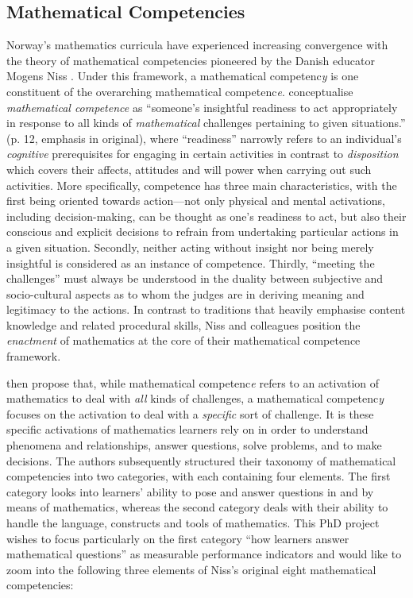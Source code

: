 \documentclass[
    a4paper,                %
    11pt,                   %
    stu,                    %
    donotrepeattitle,       %
    floatsintext,           %
    biblatex,               %
    colorlinks=true,        %
    linkcolor=red,          %
    anchorcolor=black,      %
    citecolor=blue,         %
    urlcolor=blue,          %
    bookmarks=true,         %
    bookmarksopen=false,    %
    bookmarksnumbered=true, %
    dvipsnames              %
]{apa7}
\begin{document}
\subsection{Mathematical Competencies}

Norway's mathematics curricula have experienced increasing convergence with the theory of mathematical competencies pioneered by the Danish educator Mogens Niss \parencite{niss:2003,niss:2011,niss:2019}. Under this framework, a mathematical competenc\emph{y} is one constituent of the overarching mathematical competenc\emph{e}. \textcite{niss:2019} conceptualise \emph{mathematical competence} as ``someone's insightful readiness to act appropriately in response to all kinds of \emph{mathematical} challenges pertaining to given situations.'' (p. 12, emphasis in original), where ``readiness'' narrowly refers to an individual's \emph{cognitive} prerequisites for engaging in certain activities in contrast to \emph{disposition} which covers their affects, attitudes and will power when carrying out such activities. More specifically, competence has three main characteristics, with the first being oriented towards action---not only physical and mental activations, including decision-making, can be thought as one's readiness to act, but also their conscious and explicit decisions to refrain from undertaking particular actions in a given situation. Secondly, neither acting without insight nor being merely insightful is considered as an instance of competence. Thirdly, ``meeting the challenges'' must always be understood in the duality between subjective and socio-cultural aspects as to whom the judges are in deriving meaning and legitimacy to the actions. In contrast to traditions that heavily emphasise content knowledge and related procedural skills, Niss and colleagues position the \emph{enactment} of mathematics at the core of their mathematical competence framework.

\textcite{niss:2019} then propose that, while mathematical competenc\emph{e} refers to an activation of mathematics to deal with \emph{all} kinds of challenges, a mathematical competenc\emph{y} focuses on the activation to deal with a \emph{specific} sort of challenge. It is these specific activations of mathematics learners rely on in order to understand phenomena and relationships, answer questions, solve problems, and to make decisions. The authors subsequently structured their taxonomy of mathematical competencies into two categories, with each containing four elements. The first category looks into learners' ability to pose and answer questions in and by means of mathematics, whereas the second category deals with their ability to handle the language, constructs and tools of mathematics. This PhD project wishes to focus particularly on the first category ``how learners answer mathematical questions'' as measurable performance indicators and would like to zoom into the following three elements of Niss's original eight mathematical competencies:
\end{document}

